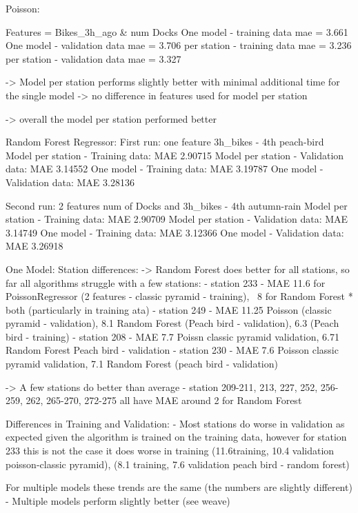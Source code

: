 \documentclass[a4paper]{article}
\begin{document}
    Poisson:

    Features = Bikes\_3h\_ago \& num Docks
    One model - training data mae = 3.661
    One model - validation data mae = 3.706
    per station - training data mae = 3.236
    per station - validation data mae = 3.327

    -> Model per station performs slightly better with minimal additional time for the single model
    -> no difference in features used for model per station

    -> overall the model per station performed better

    Random Forest Regressor:
    First run: one feature 3h\_bikes - 4th peach-bird
    Model per station - Training data: MAE 2.90715
    Model per station - Validation data: MAE 3.14552
    One model - Training data: MAE 3.19787
    One model - Validation data: MAE 3.28136

    Second run: 2 features num of Docks and 3h\_bikes - 4th autumn-rain
    Model per station - Training data: MAE 2.90709
    Model per station - Validation data: MAE 3.14749
    One model - Training data: MAE 3.12366
    One model - Validation data: MAE 3.26918

    One Model:
    Station differences:
    -> Random Forest does better for all stations, so far all algorithms struggle with a few stations:
    - station 233 - MAE 11.6 for PoissonRegressor (2 features - classic pyramid - training), ~8 for Random Forest * both (particularly in training ata)
    - station 249 - MAE 11.25 Poisson (classic pyramid - validation), 8.1 Random Forest (Peach bird - validation),
    6.3 (Peach bird - training)
    - station 208 - MAE 7.7 Poissn classic pyramid validation, 6.71 Random Forest Peach bird - validation
    - station 230 - MAE 7.6 Poisson classic pyramid validation, 7.1 Random Forest (peach bird - validation)

    -> A few stations do better than average
    - station 209-211, 213, 227, 252, 256-259, 262, 265-270, 272-275 all have MAE around 2 for Random Forest

    Differences in Training and Validation:
    - Most stations do worse in validation as expected given the algorithm is trained on the training data, however for station
    233 this is not the case it does worse in training (11.6training, 10.4 validation poisson-classic pyramid),
    (8.1 training, 7.6 validation peach bird -  random forest)

    For multiple models these trends are the same (the numbers are slightly different)
    - Multiple models perform slightly better (see weave)
\end{document}

